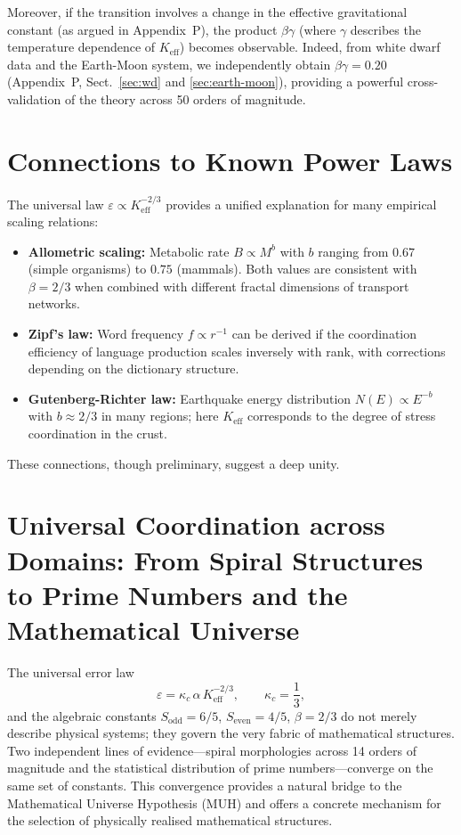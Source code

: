 \documentclass[12pt]{article}
\newcommand{\Keff}{K_{\mathrm{eff}}}
\newcommand{\eps}{\varepsilon}
\newcommand{\kappac}{\kappa_c}
\begin{document}
	Moreover, if the transition involves a change in the effective gravitational constant (as argued in Appendix~P), the product \(\beta\gamma\) (where \(\gamma\) describes the temperature dependence of \(K_{\mathrm{eff}}\)) becomes observable. Indeed, from white dwarf data and the Earth-Moon system, we independently obtain \(\beta\gamma = 0.20\) (Appendix~P, Sect.~\ref{sec:wd} and \ref{sec:earth-moon}), providing a powerful cross-validation of the theory across 50 orders of magnitude.
	
	\section{Connections to Known Power Laws}
	\label{sec:connections}
	
	The universal law \(\eps \propto \Keff^{-2/3}\) provides a unified explanation for many empirical scaling relations:
	
	\begin{itemize}
		\item \textbf{Allometric scaling:} Metabolic rate \(B \propto M^{b}\) with \(b\) ranging from \(0.67\) (simple organisms) to \(0.75\) (mammals). Both values are consistent with \(\beta = 2/3\) when combined with different fractal dimensions of transport networks.
		\item \textbf{Zipf's law:} Word frequency \(f \propto r^{-1}\) can be derived if the coordination efficiency of language production scales inversely with rank, with corrections depending on the dictionary structure.
		\item \textbf{Gutenberg-Richter law:} Earthquake energy distribution \(N(E) \propto E^{-b}\) with \(b \approx 2/3\) in many regions; here \(\Keff\) corresponds to the degree of stress coordination in the crust.
	\end{itemize}
	
	These connections, though preliminary, suggest a deep unity.
	
	
	\section{Universal Coordination across Domains: From Spiral Structures to Prime Numbers and the Mathematical Universe}
	
	The universal error law
	\begin{equation}
		\eps = \kappac\,\alpha\,\Keff^{-2/3}, \qquad \kappac = \frac{1}{3},
		\label{eq:errorlaw}
	\end{equation}
	and the algebraic constants \(S_{\mathrm{odd}}=6/5\), \(S_{\mathrm{even}}=4/5\), \(\beta=2/3\) do not merely describe physical systems; they govern the very fabric of mathematical structures. Two independent lines of evidence—spiral morphologies across 14 orders of magnitude and the statistical distribution of prime numbers—converge on the same set of constants. This convergence provides a natural bridge to the Mathematical Universe Hypothesis (MUH) and offers a concrete mechanism for the selection of physically realised mathematical structures.
	
\end{document}
